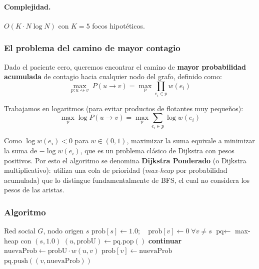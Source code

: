 \documentclass[spanish,notitlepage,letterpaper, 12pt]{article}
\begin{document}
\paragraph{Complejidad.} $O(K \cdot N \log N)$ con $K = 5$ focos hipot\'eticos.

\subsubsection{El problema del camino de mayor contagio}

Dado el paciente cero, queremos encontrar el camino de \textbf{mayor probabilidad acumulada} de contagio hacia cualquier nodo del grafo, definido como:
\begin{equation}
\max_{p: u \rightsquigarrow v} \; P(u \rightarrow v) = \max_p \prod_{e_i \in p} w(e_i)
\end{equation}

Trabajamos en logaritmos (para evitar productos de flotantes muy peque\~nos):
\begin{equation}
\max_p \log P(u \rightarrow v) = \max_p \sum_{e_i \in p} \log w(e_i)
\end{equation}

Como $\log w(e_i) < 0$ para $w \in (0,1)$, maximizar la suma equivale a minimizar la suma de $-\log w(e_i)$, que es un problema cl\'asico de Dijkstra con pesos positivos. Por esto el algoritmo se denomina \textbf{Dijkstra Ponderado} (o Dijkstra multiplicativo): utiliza una cola de prioridad (\textit{max-heap} por probabilidad acumulada) que lo distingue fundamentalmente de BFS, el cual no considera los pesos de las aristas.

\subsubsection{Algoritmo}

\begin{algorithm}[H]
\caption{Dijkstra Ponderado -- camino de m\'axima probabilidad de contagio}
\begin{algorithmic}[1]
\Require Red social $G$, nodo origen $s$
\State $\text{prob}[s] \gets 1.0; \quad \text{prob}[v] \gets 0 \;\forall v \neq s$
\State $\text{pq} \gets$ max-heap con $(s, 1.0)$
    \State $(u, \text{probU}) \gets \text{pq}.\text{pop}()$ 
     \textbf{continuar} \EndIf
        \State $\text{nuevaProb} \gets \text{probU} \cdot w(u, v)$
            \State $\text{prob}[v] \gets \text{nuevaProb}$
            \State $\text{pq}.\text{push}((v, \text{nuevaProb}))$
        \EndIf
    \EndFor
\EndWhile
\end{algorithmic}
\end{algorithm}
\end{document}

